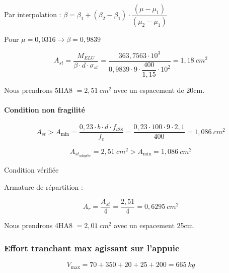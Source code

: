 \documentclass[12pt,a4paper]{article}
\begin{document}
	Par interpolation : $\beta = \beta_{1} + (\beta_{2} - \beta_{1}) \cdot \dfrac{(\mu - \mu_{1})}{(\mu_{2} - \mu_{1})}$
	
	Pour $\mu = 0,0316 \rightarrow \beta = 0,9839$
	
	\[ A_{st} = \dfrac{M_{ELU}}{\beta \cdot d \cdot \sigma_{st}} = \dfrac{363,7563 \cdot 10^{3}}{0,9839 \cdot 9 \cdot \dfrac{400}{1,15} \cdot 10^{2}} = 1,18 ~\unit{cm^{2}} \]
	
	Nous prendrons 5HA8 $ = 2,51 ~\unit{cm^{2}}$ avec un espacement de 20cm.
	
	
	
	\paragraph{Condition non fragilité}
	
	\[ A_{st} > A_{\min} = \dfrac{0,23 \cdot b \cdot d \cdot f_{t28}}{f_{e}} = \dfrac{0,23 \cdot 100 \cdot 9 \cdot 2,1}{400} = 1,086 ~\unit{cm^{2}} \]
	
	\[ A_{st_{adoptée}} = 2,51 ~\unit{cm^{2}} > A_{\min}  = 1,086 ~\unit{cm^{2}} \]
	
	{\centering Condition vérifiée \par}
	
	\vspace{\baselineskip}
	
	
	
	Armature de répartition : 
	
	\[ A_{r} = \dfrac{A_{st}}{4} = \dfrac{2,51}{4} = 0,6295 ~\unit{cm^{2}} \]
	
	Nous prendrons 4HA8 $ = 2,01 ~\unit{cm^{2}}$ avec un espacement 25cm.
	
	
	\subsubsection{Effort tranchant max agissant sur l'appuie}
	
	\[ V_{\max} = 70 + 350 + 20 + 25 + 200 = 665 ~\unit{kg} \]
	
\end{document}
